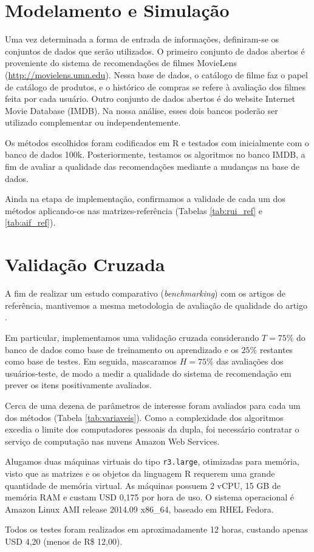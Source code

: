 \section{Modelamento e Simulação} %
\label{sec:modelamento_e_simula_o}



Uma vez determinada a forma de entrada de informações, definiram-se os conjuntos de dados que serão utilizados. O primeiro conjunto de dados abertos é proveniente do sistema de recomendações de filmes MovieLens (\url{http://movielens.umn.edu}). Nessa base de dados, o catálogo de filme faz o papel de catálogo de produtos, e o histórico de compras se refere à avaliação dos filmes feita por cada usuário. Outro conjunto de dados abertos é do website Internet Movie Database (IMDB). Na nossa análise, esses dois bancos poderão ser utilizado complementar ou independentemente.

Os métodos escolhidos foram codificados em R e testados com inicialmente com o banco de dados 100k. Posteriormente, testamos os algoritmos no banco IMDB, a fim de avaliar a qualidade das recomendações mediante a mudanças na base de dados.

Ainda na etapa de implementação, confirmamos a validade de cada um dos métodos aplicando-os nas matrizes-referência (Tabelas \ref{tab:rui_ref} e \ref{tab:aif_ref}). 

\section{Validação Cruzada} %
\label{sec:prot_tipos_testes}

A fim de realizar um estudo comparativo (\textit{benchmarking}) com os artigos de referência, mantivemos a mesma metodologia de avaliação de qualidade do artigo .

Em particular, implementamos uma validação cruzada considerando $T=75\%$ do banco de dados como base de treinamento ou aprendizado e os $25\%$ restantes como base de testes. Em seguida, mascaramos $H=75\%$ das avaliações dos usuários-teste, de modo a medir a qualidade do sistema de recomendação em prever os itens positivamente avaliados. 

Cerca de uma dezena de parâmetros de interesse foram avaliados para cada um dos métodos (Tabela \ref{tab:variaveis}). Como a complexidade dos algoritmos excedia o limite dos computadores pessoais da dupla, foi necessário contratar o serviço de computação nas nuvens Amazon Web Services.

Alugamos duas máquinas virtuais do tipo \texttt{r3.large}, otimizadas para memória, visto que as matrizes e os objetos da linguagem R requerem uma grande quantidade de memória virtual. As máquinas possuem 2 vCPU, 15 GB de memória RAM e custam USD 0,175 por hora de uso. O sistema operacional é Amazon Linux AMI release 2014.09 x86\_64, baseado em RHEL Fedora. 

Todos os testes foram realizados em aproximadamente 12 horas, custando apenas USD 4,20 (menos de R\$ 12,00).
